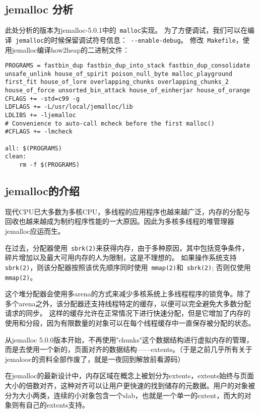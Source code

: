 \begin{center}
    \section{jemalloc 分析}
\end{center}

\setlength{\parindent}{2em}
此处分析的版本为jemalloc-5.0.1中的\verb+ malloc+实现。
为了方便调试，我们可以在编译\verb+ jemalloc+的时候保留调试符号信息：\verb+ --enable-debug+。
修改\verb+ Makefile+，使用jemalloc编译how2heap的二进制文件：
\begin{verbatim}
PROGRAMS = fastbin_dup fastbin_dup_into_stack fastbin_dup_consolidate unsafe_unlink house_of_spirit poison_null_byte malloc_playground first_fit house_of_lore overlapping_chunks overlapping_chunks_2 house_of_force unsorted_bin_attack house_of_einherjar house_of_orange
CFLAGS += -std=c99 -g
LDFLAGS += -L/usr/local/jemalloc/lib
LDLIBS += -ljemalloc
# Convenience to auto-call mcheck before the first malloc()
#CFLAGS += -lmcheck

all: $(PROGRAMS)
clean:
    rm -f $(PROGRAMS)
\end{verbatim}

\subsection{jemalloc的介绍}

现代CPU已大多数为多核CPU，多线程的应用程序也越来越广泛，内存的分配与回收也越来越成为制约程序性能的一大原因。因此为多核多线程的堆管理器jemalloc应运而生。

在过去，分配器使用\verb+ sbrk(2)+来获得内存，由于多种原因，其中包括竞争条件，碎片增加以及最大可用内存的人为限制，这是不理想的。 如果操作系统支持\verb+ sbrk(2)+，则该分配器按照该优先顺序同时使用\verb+ mmap(2)+和\verb+ sbrk(2)+; 否则仅使用\verb+ mmap(2)+。

这个堆分配器会使用多arena的方式来减少多核系统上多线程程序的锁竞争。除了多个arena之外，该分配器还支持线程特定的缓存，以便可以完全避免大多数分配请求的同步。 这样的缓存允许在正常情况下进行快速分配，但是它增加了内存的使用和分段，因为有限数量的对象可以在每个线程缓存中一直保存被分配的状态。

从jemalloc 5.0.0版本开始，不再使用"chunks"这个数据结构进行虚拟内存的管理，而是去使用一个新的，页面对齐的数据结构——extents。（于是之前几乎所有关于jemalooc的资料全部作废了，就是一夜回到解放前看源码）

在jemalloc的最新设计中，内存区域在概念上被划分为extents，extents始终与页面大小的倍数对齐，这种对齐可以让用户更快速的找到储存的元数据。用户的对象被分为大小两类，连续的小对象包含一个slab，也就是一个单一的extent，而大的对象则有自己的extents支持。

